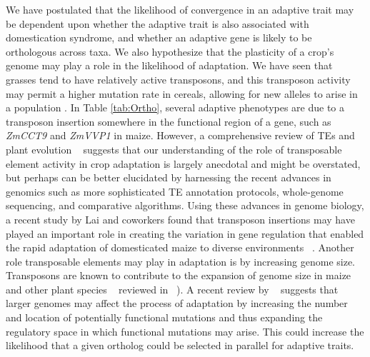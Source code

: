 \documentclass[12pt]{article}
\newcommand{\mbh}[1]{\textcolor{red}{\normalsize  #1}}
\newcommand{\mw}[1]{\textcolor{cornflowerblue}{\normalsize #1}}
\begin{document}
We have postulated that the likelihood of convergence in an adaptive trait may be dependent upon whether the adaptive trait is also associated with domestication syndrome, and whether an adaptive gene is likely to be orthologous across taxa. We also hypothesize that the plasticity of a crop's genome may play a role in the likelihood of adaptation. We have seen that grasses tend to have relatively active transposons, and this transposon activity may permit a higher mutation rate in cereals, allowing for new alleles to arise in a population \citep{Wicker2016}. 
In Table \ref{tab:Ortho}, several adaptive phenotypes are due to a transposon insertion somewhere in the functional region of a gene, such as \textit{ZmCCT9} and \textit{ZmVVP1} in maize.
However, a comprehensive review of TEs and plant evolution ~\citep{Lisch2013} suggests that our understanding of the role of transposable element activity in crop adaptation is largely anecdotal and might be overstated, but perhaps can be better elucidated by harnessing the recent advances in genomics such as more sophisticated TE annotation protocols, whole-genome sequencing, and comparative algorithms.
Using these advances in genome biology, a recent study by Lai and coworkers found that transposon insertions may have played an important role in creating the variation in gene regulation that enabled the rapid adaptation of domesticated maize to diverse environments ~\citep{Lai2017}.  
Another role transposable elements may play in adaptation is by increasing genome size. Transposons are known to contribute to the expansion of genome size in maize and other plant species ~\citep{Tenaillon2011} reviewed in ~\citep{Lisch2013}). A recent review  by ~\citep{Mei2018} suggests that larger genomes may affect the process of adaptation by increasing the number and location of potentially functional mutations and thus expanding the regulatory space in which functional mutations may arise. This could increase the likelihood that a given ortholog could be selected in parallel for adaptive traits. 

\end{document}
